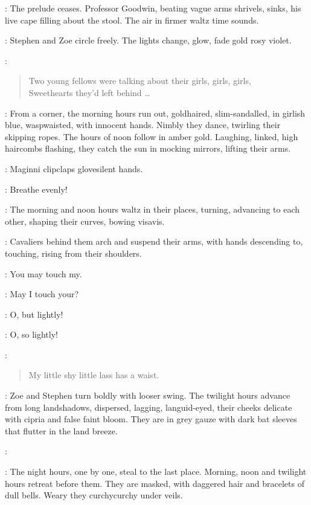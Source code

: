 :
The prelude ceases.
Professor Goodwin, beating vague arms shrivels, sinks,
his live cape filling about the stool.
The air in firmer waltz time sounds.

:
Stephen and Zoe circle freely.
The lights change,
glow, fade gold rosy violet.

\Pianola[2]:
\begin{verse}
    Two young fellows were talking about their girls, girls, girls,\\
    Sweethearts they'd left behind \ldots
\end{verse}

:
From a corner, the morning hours run out, goldhaired, slim-sandalled,
in girlish blue, waspwaisted, with innocent hands.
Nimbly they dance, twirling their skipping ropes.
The hours of noon follow in amber gold.
Laughing, linked, high haircombs flashing,
they catch the sun in mocking mirrors, lifting their arms.

:
Maginni clipclaps glovesilent hands.

\Maginni:
Breathe evenly!

:
The morning and noon hours waltz in their places, turning,
advancing to each other, shaping their curves, bowing visavis.

:
Cavaliers behind them arch and suspend their arms,
with hands descending to, touching, rising from their shoulders.

\Hours:
You may touch my.

\Cavaliers:
May I touch your?

\Hours:
O, but lightly!

\Cavaliers:
O, so lightly!

\Pianola:
\begin{verse}
    My little shy little lass has a waist.
\end{verse}

:
Zoe and Stephen turn boldly with looser swing.
The twilight hours advance from long landshadows, dispersed, lagging, languid-eyed,
their cheeks delicate with cipria and false faint bloom.
They are in grey gauze with dark bat sleeves that flutter in the land breeze.

\Maginni[2]:

:
The night hours, one by one, steal to the last place.
Morning, noon and twilight hours retreat before them.
They are masked, with daggered hair and bracelets of dull bells.
Weary they curchycurchy under veils.

